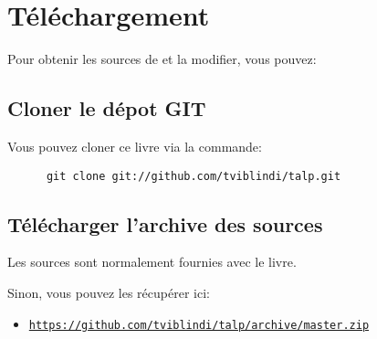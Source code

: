 
\section*{Téléchargement}

  Pour obtenir les sources de  et la
  modifier, vous pouvez:

  \subsection*{Cloner le dépot GIT}
    Vous pouvez cloner ce livre via la commande:
    \begin{verbatim}
      git clone git://github.com/tviblindi/talp.git
    \end{verbatim}

  \subsection*{Télécharger l’archive des sources}
    Les sources sont normalement fournies avec le livre.
      
    Sinon, vous pouvez les récupérer ici:
    \begin{itemize}
      \item \href{https://github.com/tviblindi/talp/archive/master.zip}{\texttt{https://github.com/tviblindi/talp/archive/master.zip}}
    \end{itemize}
